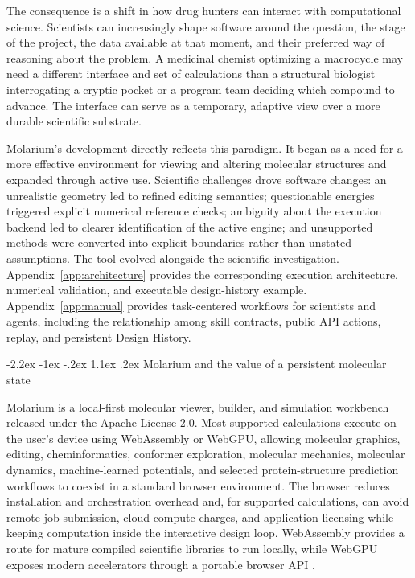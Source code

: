 \documentclass[11pt]{article}
\makeatletter
\renewcommand\section{\@startsection{section}{1}{\z@}%
  {-2.2ex \@plus -1ex \@minus -.2ex}%
  {1.1ex \@plus .2ex}%
  {\normalfont\Large\bfseries\color{molblue}}}
\makeatother
\begin{document}
The consequence is a shift in how drug hunters can interact with computational science. Scientists can increasingly shape software around the question, the stage of the project, the data available at that moment, and their preferred way of reasoning about the problem. A medicinal chemist optimizing a macrocycle may need a different interface and set of calculations than a structural biologist interrogating a cryptic pocket or a program team deciding which compound to advance. The interface can serve as a temporary, adaptive view over a more durable scientific substrate.

Molarium's development directly reflects this paradigm. It began as a need for a more effective environment for viewing and altering molecular structures and expanded through active use. Scientific challenges drove software changes: an unrealistic geometry led to refined editing semantics; questionable energies triggered explicit numerical reference checks; ambiguity about the execution backend led to clearer identification of the active engine; and unsupported methods were converted into explicit boundaries rather than unstated assumptions. The tool evolved alongside the scientific investigation. Appendix~\ref{app:architecture} provides the corresponding execution architecture, numerical validation, and executable design-history example. Appendix~\ref{app:manual} provides task-centered workflows for scientists and agents, including the relationship among skill contracts, public API actions, replay, and persistent Design History.

\section{Molarium and the value of a persistent molecular state}

Molarium is a local-first molecular viewer, builder, and simulation workbench released under the Apache License 2.0. Most supported calculations execute on the user's device using WebAssembly or WebGPU, allowing molecular graphics, editing, cheminformatics, conformer exploration, molecular mechanics, molecular dynamics, machine-learned potentials, and selected protein-structure prediction workflows to coexist in a standard browser environment. The browser reduces installation and orchestration overhead and, for supported calculations, can avoid remote job submission, cloud-compute charges, and application licensing while keeping computation inside the interactive design loop. WebAssembly provides a route for mature compiled scientific libraries to run locally, while WebGPU exposes modern accelerators through a portable browser API \citep{haas2017wasm,webgpu2025}.
\end{document}
